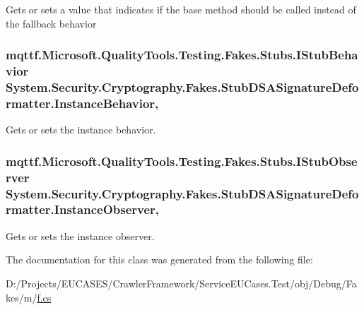 Gets or sets a value that indicates if the base method should be called instead of the fallback behavior

\hypertarget{class_system_1_1_security_1_1_cryptography_1_1_fakes_1_1_stub_d_s_a_signature_deformatter_a3cf25856eed69bb6be5885d195c74481}{
\subsubsection[{Instance\-Behavior}]{\setlength{\rightskip}{0pt plus 5cm}mqttf.\-Microsoft.\-Quality\-Tools.\-Testing.\-Fakes.\-Stubs.\-I\-Stub\-Behavior System.\-Security.\-Cryptography.\-Fakes.\-Stub\-D\-S\-A\-Signature\-Deformatter.\-Instance\-Behavior\hspace{0.3cm}{\ttfamily [get]}, {\ttfamily [set]}}}\label{class_system_1_1_security_1_1_cryptography_1_1_fakes_1_1_stub_d_s_a_signature_deformatter_a3cf25856eed69bb6be5885d195c74481}


Gets or sets the instance behavior.

\hypertarget{class_system_1_1_security_1_1_cryptography_1_1_fakes_1_1_stub_d_s_a_signature_deformatter_afaf9df47363ffbbb9b38dfa5ec86dc6a}{
\subsubsection[{Instance\-Observer}]{\setlength{\rightskip}{0pt plus 5cm}mqttf.\-Microsoft.\-Quality\-Tools.\-Testing.\-Fakes.\-Stubs.\-I\-Stub\-Observer System.\-Security.\-Cryptography.\-Fakes.\-Stub\-D\-S\-A\-Signature\-Deformatter.\-Instance\-Observer\hspace{0.3cm}{\ttfamily [get]}, {\ttfamily [set]}}}\label{class_system_1_1_security_1_1_cryptography_1_1_fakes_1_1_stub_d_s_a_signature_deformatter_afaf9df47363ffbbb9b38dfa5ec86dc6a}


Gets or sets the instance observer.



The documentation for this class was generated from the following file\-:\begin{DoxyCompactItemize}
\item 
D\-:/\-Projects/\-E\-U\-C\-A\-S\-E\-S/\-Crawler\-Framework/\-Service\-E\-U\-Cases.\-Test/obj/\-Debug/\-Fakes/m/\hyperlink{m_2f_8cs}{f.\-cs}\end{DoxyCompactItemize}
